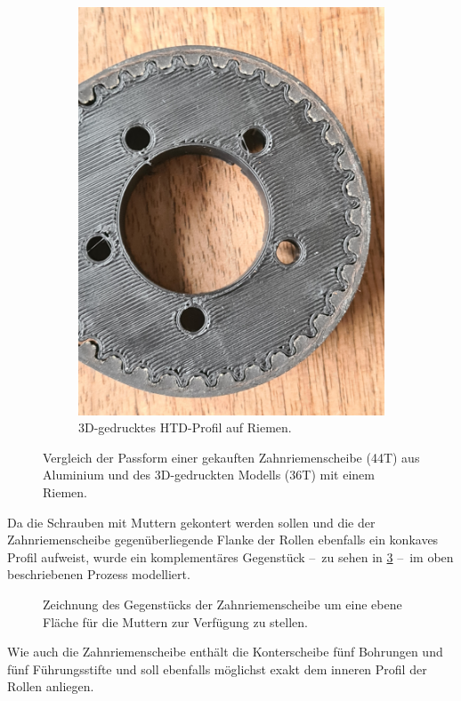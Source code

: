 \begin{figure}[h]
\begin{subfigure}{.49\textwidth}
				\includegraphics[width=\textwidth]{Footage/Pictures/Printed-HTD_tooth_fit.jpg}
				\caption{3D-gedrucktes HTD-Profil auf Riemen.}%
				\label{subfig:printed HTD}
			\end{subfigure}
			\caption{Vergleich der Passform einer gekauften Zahnriemenscheibe (44T) aus Aluminium und des 3D-gedruckten Modells (36T) mit einem Riemen.}%
			\label{fig:HTD profiles comparison}
		\end{figure}\par\medskip
		Da die Schrauben mit Muttern gekontert werden sollen und die der Zahnriemenscheibe gegenüberliegende Flanke der Rollen ebenfalls ein konkaves Profil aufweist, wurde ein komplementäres Gegenstück --~zu sehen in \cref{fig:orangatang kegel flat face} --~im oben beschriebenen Prozess modelliert.
		\begin{figure}[h]
			\centering
			
			\caption[Zeichnung des Gegenstücks der Zahnriemenscheibe]{Zeichnung des Gegenstücks der Zahnriemenscheibe um eine ebene Fläche für die Muttern zur Verfügung zu stellen.}%
			\label{fig:orangatang kegel flat face}
		\end{figure}
		Wie auch die Zahnriemenscheibe enthält die Konterscheibe fünf Bohrungen und fünf Führungsstifte und soll ebenfalls möglichst exakt dem inneren Profil der Rollen anliegen.
		
